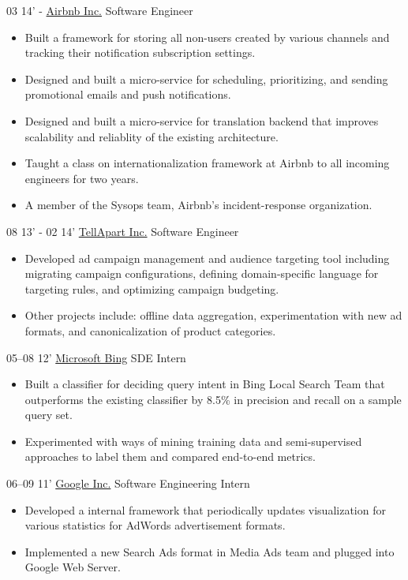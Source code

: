 \documentclass[]{patyoon-cv}
\begin{document}
\begin{entrylist}
  \entry
  {03 14' - }
  {\href{https://www.airbnb.com/}{Airbnb Inc.}}
  {Software Engineer}
  {\begin{itemize}
    \item Built a framework for storing all non-users created by various channels and tracking their notification subscription settings.
    \item Designed and built a micro-service for scheduling, prioritizing, and sending promotional emails and push notifications.
    \item Designed and built a micro-service for translation backend that improves scalability and reliablity of the existing architecture.
    \item Taught a class on internationalization framework at Airbnb to all incoming engineers for two years.
    \item A member of the Sysops team, Airbnb's incident-response organization.
    \end{itemize}
  }
  \entry
  {08 13' - 02 14'}
  {\href{https://tellapart.com/}{TellApart Inc.}}
  {Software Engineer}
  {\begin{itemize}
    \item Developed ad campaign management and audience targeting tool including migrating campaign configurations, defining domain-specific language for targeting rules, and optimizing campaign budgeting.
    \item Other projects include: offline data aggregation, experimentation with new ad formats, and canonicalization of product categories.
    \end{itemize}
  }
  \entry
  {05–08 12'}
  {\href{http://bing.com/}{Microsoft Bing}}
  {SDE Intern}
  {\begin{itemize}
    \item Built a classifier for deciding query intent in Bing Local Search Team that outperforms the existing classifier by 8.5\% in precision and recall on a sample query set.
    \item Experimented with ways of mining training data and semi-supervised approaches to label them and compared end-to-end metrics.
    \end{itemize}}
  \entry
  {06–09 11'}
  {\href{http://www.google.com}{Google Inc.}}
  {Software Engineering Intern}
  {\begin{itemize}
    \item Developed a internal framework that periodically updates visualization for various statistics for AdWords advertisement formats.
    \item Implemented a new Search Ads format in Media Ads team and plugged into Google Web Server.
    \end{itemize}}
\end{entrylist}
\end{document}
